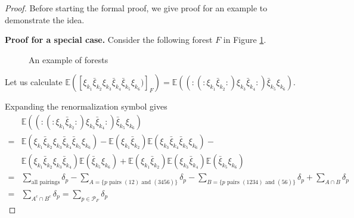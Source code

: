  \begin{proof} Before starting the formal proof, we give proof for an example to demonstrate the idea.
  
 \textbf{Proof for a special case.} Consider the following forest $F$ in Figure \ref{fig.forestexample.fourwave}.
 
 \begin{figure}[H]
  \centering
  \caption{An example of forests}
  \label{fig.forestexample.fourwave}
 \end{figure}
 
 Let us calculate $\mathbb{E}([\xi_{k_1}\bar{\xi}_{k_2}\xi_{k_3}\bar{\xi}_{k_4}\bar{\xi}_{k_5}\xi_{k_6})]_{F})=\mathbb{E}((:(:\xi_{k_1}\bar{\xi}_{k_2}:)\xi_{k_3}\bar{\xi}_{k_4}:)\bar{\xi}_{k_5}\xi_{k_6})$.
 
 Expanding the renormalization symbol gives
 \begin{equation}
  \begin{split}
  &\mathbb{E}((:(:\xi_{k_1}\bar{\xi}_{k_2}:)\xi_{k_3}\bar{\xi}_{k_4}:)\bar{\xi}_{k_5}\xi_{k_6})
  \\
  =&\mathbb{E}(\xi_{k_1}\bar{\xi}_{k_2}\xi_{k_3}\bar{\xi}_{k_4}\bar{\xi}_{k_5}\xi_{k_6})-\mathbb{E}(\xi_{k_1}\bar{\xi}_{k_2})\mathbb{E}( \xi_{k_3}\bar{\xi}_{k_4}\bar{\xi}_{k_5}\xi_{k_6})-
  \\
  &\mathbb{E}(\xi_{k_1}\bar{\xi}_{k_2}\xi_{k_3}\bar{\xi}_{k_4})\mathbb{E}( \bar{\xi}_{k_5}\xi_{k_6}) + \mathbb{E}(\xi_{k_1}\bar{\xi}_{k_2})\mathbb{E}(\xi_{k_3}\bar{\xi}_{k_4})\mathbb{E}( \bar{\xi}_{k_5}\xi_{k_6})
  \\
  =&\sum_{\text{all pairings}} \delta_p - \sum_{A=\{p \text{ pairs } (12)\text{ and }(3456)\}} \delta_p-\sum_{B = \{p \text{ pairs } (1234)\text{ and }(56)\}} \delta_p+\sum_{A\cap B} \delta_p
  \\
  = & \sum_{A^c\cap B^c} \delta_p = \sum_{p\in \mathcal{P}_F} \delta_p
  \end{split}
 \end{equation}
 

\end{proof}
